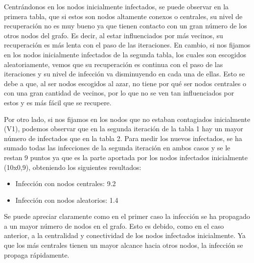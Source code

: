 \documentclass[
]{article}
\begin{document}
Centrándonos en los nodos inicialmente infectados, se puede observar en
la primera tabla, que si estos son nodos altamente conexos o centrales,
su nivel de recuperación no es muy bueno ya que tienen contacto con un
gran número de los otros nodos del grafo. Es decir, al estar
influenciados por más vecinos, su recuperación es más lenta con el paso
de las iteraciones. En cambio, si nos fijamos en los nodos inicialmente
infectados de la segunda tabla, los cuales son escogidos aleatoriamente,
vemos que su recuperación es continua con el paso de las iteraciones y
su nivel de infección va disminuyendo en cada una de ellas. Esto se debe
a que, al ser nodos escogidos al azar, no tiene por qué ser nodos
centrales o con una gran cantidad de vecinos, por lo que no se ven tan
influenciados por estos y es más fácil que se recupere.

Por otro lado, si nos fijamos en los nodos que no estaban contagiados
inicialmente (V1), podemos observar que en la segunda iteración de la
tabla 1 hay un mayor número de infectados que en la tabla 2. Para medir
los nuevos infectados, se ha sumado todas las infecciones de la segunda
iteración en ambos casos y se le restan 9 puntos ya que es la parte
aportada por los nodos infectados inicialmente (10x0,9), obteniendo los
siguientes resultados:

\begin{itemize}
\item
  Infección con nodos centrales: 9.2
\item
  Infección con nodos aleatorios: 1.4
\end{itemize}

Se puede apreciar claramente como en el primer caso la infección se ha
propagado a un mayor número de nodos en el grafo. Esto es debido, como
en el caso anterior, a la centralidad y conectividad de los nodos
infectados inicialmente. Ya que los más centrales tienen un mayor
alcance hacia otros nodos, la infección se propaga rápidamente.
\end{document}

